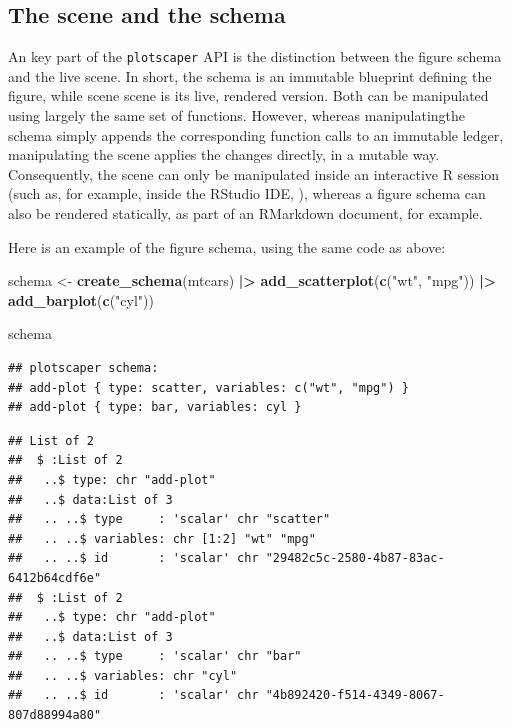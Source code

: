 \documentclass[
]{book}
\newenvironment{Shaded}{\begin{snugshade}}{\end{snugshade}}
\newcommand{\FunctionTok}[1]{\textcolor[rgb]{0.13,0.29,0.53}{\textbf{#1}}}
\newcommand{\NormalTok}[1]{#1}
\newcommand{\OtherTok}[1]{\textcolor[rgb]{0.56,0.35,0.01}{#1}}
\newcommand{\SpecialCharTok}[1]{\textcolor[rgb]{0.81,0.36,0.00}{\textbf{#1}}}
\newcommand{\StringTok}[1]{\textcolor[rgb]{0.31,0.60,0.02}{#1}}
\theoremstyle{definition}
\theoremstyle{definition}
\theoremstyle{definition}
\theoremstyle{definition}
\theoremstyle{remark}
\begin{document}
\subsection{The scene and the schema}\label{scene-and-schema}

An key part of the \texttt{plotscaper} API is the distinction between the figure schema and the live scene. In short, the schema is an immutable blueprint defining the figure, while scene scene is its live, rendered version. Both can be manipulated using largely the same set of functions. However, whereas manipulatingthe schema simply appends the corresponding function calls to an immutable ledger, manipulating the scene applies the changes directly, in a mutable way. Consequently, the scene can only be manipulated inside an interactive R session (such as, for example, inside the RStudio IDE, ), whereas a figure schema can also be rendered statically, as part of an RMarkdown document, for example.

Here is an example of the figure schema, using the same code as above:

\begin{Shaded}
\begin{Highlighting}[]
\NormalTok{schema }\OtherTok{\textless{}{-}} \FunctionTok{create\_schema}\NormalTok{(mtcars) }\SpecialCharTok{|\textgreater{}}
  \FunctionTok{add\_scatterplot}\NormalTok{(}\FunctionTok{c}\NormalTok{(}\StringTok{"wt"}\NormalTok{, }\StringTok{"mpg"}\NormalTok{)) }\SpecialCharTok{|\textgreater{}}
  \FunctionTok{add\_barplot}\NormalTok{(}\FunctionTok{c}\NormalTok{(}\StringTok{"cyl"}\NormalTok{))}

\NormalTok{schema}
\end{Highlighting}
\end{Shaded}

\begin{verbatim}
## plotscaper schema:
## add-plot { type: scatter, variables: c("wt", "mpg") }
## add-plot { type: bar, variables: cyl }
\end{verbatim}

\begin{Shaded}
\end{Shaded}

\begin{verbatim}
## List of 2
##  $ :List of 2
##   ..$ type: chr "add-plot"
##   ..$ data:List of 3
##   .. ..$ type     : 'scalar' chr "scatter"
##   .. ..$ variables: chr [1:2] "wt" "mpg"
##   .. ..$ id       : 'scalar' chr "29482c5c-2580-4b87-83ac-6412b64cdf6e"
##  $ :List of 2
##   ..$ type: chr "add-plot"
##   ..$ data:List of 3
##   .. ..$ type     : 'scalar' chr "bar"
##   .. ..$ variables: chr "cyl"
##   .. ..$ id       : 'scalar' chr "4b892420-f514-4349-8067-807d88994a80"
\end{verbatim}
\end{document}
